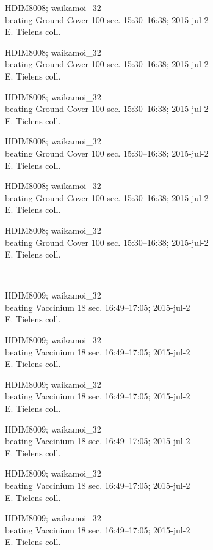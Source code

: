\documentclass[2pt]{extarticle}
\begin{document}
\noindent
\parbox{0.16\textwidth}{\tiny \raggedright \rule[-0.3\baselineskip]{0pt}{10pt}HDIM8008; waikamoi\_32\\ beating Ground Cover 100 sec. 15:30--16:38; 2015-jul-2\\ E. Tielens coll.}
\parbox{0.16\textwidth}{\tiny \raggedright \rule[-0.3\baselineskip]{0pt}{10pt}HDIM8008; waikamoi\_32\\ beating Ground Cover 100 sec. 15:30--16:38; 2015-jul-2\\ E. Tielens coll.}
\parbox{0.16\textwidth}{\tiny \raggedright \rule[-0.3\baselineskip]{0pt}{10pt}HDIM8008; waikamoi\_32\\ beating Ground Cover 100 sec. 15:30--16:38; 2015-jul-2\\ E. Tielens coll.}
\parbox{0.16\textwidth}{\tiny \raggedright \rule[-0.3\baselineskip]{0pt}{10pt}HDIM8008; waikamoi\_32\\ beating Ground Cover 100 sec. 15:30--16:38; 2015-jul-2\\ E. Tielens coll.}
\parbox{0.16\textwidth}{\tiny \raggedright \rule[-0.3\baselineskip]{0pt}{10pt}HDIM8008; waikamoi\_32\\ beating Ground Cover 100 sec. 15:30--16:38; 2015-jul-2\\ E. Tielens coll.}
\parbox{0.16\textwidth}{\tiny \raggedright \rule[-0.3\baselineskip]{0pt}{10pt}HDIM8008; waikamoi\_32\\ beating Ground Cover 100 sec. 15:30--16:38; 2015-jul-2\\ E. Tielens coll.} \\ 
\vspace{0.001in} 

\noindent
\parbox{0.16\textwidth}{\tiny \raggedright \rule[-0.3\baselineskip]{0pt}{10pt}HDIM8009; waikamoi\_32\\ beating Vaccinium 18 sec. 16:49--17:05; 2015-jul-2\\ E. Tielens coll.}
\parbox{0.16\textwidth}{\tiny \raggedright \rule[-0.3\baselineskip]{0pt}{10pt}HDIM8009; waikamoi\_32\\ beating Vaccinium 18 sec. 16:49--17:05; 2015-jul-2\\ E. Tielens coll.}
\parbox{0.16\textwidth}{\tiny \raggedright \rule[-0.3\baselineskip]{0pt}{10pt}HDIM8009; waikamoi\_32\\ beating Vaccinium 18 sec. 16:49--17:05; 2015-jul-2\\ E. Tielens coll.}
\parbox{0.16\textwidth}{\tiny \raggedright \rule[-0.3\baselineskip]{0pt}{10pt}HDIM8009; waikamoi\_32\\ beating Vaccinium 18 sec. 16:49--17:05; 2015-jul-2\\ E. Tielens coll.}
\parbox{0.16\textwidth}{\tiny \raggedright \rule[-0.3\baselineskip]{0pt}{10pt}HDIM8009; waikamoi\_32\\ beating Vaccinium 18 sec. 16:49--17:05; 2015-jul-2\\ E. Tielens coll.}
\parbox{0.16\textwidth}{\tiny \raggedright \rule[-0.3\baselineskip]{0pt}{10pt}HDIM8009; waikamoi\_32\\ beating Vaccinium 18 sec. 16:49--17:05; 2015-jul-2\\ E. Tielens coll.} \\ 
\vspace{0.001in} 
\end{document}
